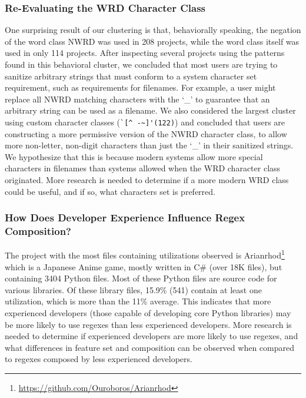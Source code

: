 \subsubsection{Re-Evaluating the WRD Character Class}
One surprising result of our clustering is that, behaviorally speaking, the negation of the word class NWRD was used in 208 projects, while the word class itself was used in only 114 projects. After inspecting several projects using the patterns found in this behavioral cluster, we concluded that most users are trying to sanitize arbitrary strings that must conform to a system character set requirement, such as requirements for filenames.  For example, a user might replace all NWRD matching characters with the `\_' to guarantee that an arbitrary string can be used as a filename.  We also considered the largest cluster using custom character classes (\verb?`[^ -~]'(122)?) and concluded that users are constructing a more permissive version of the NWRD character class, to allow more non-letter, non-digit characters than just the `\_' in their sanitized strings.  We hypothesize that this is because modern systems allow more special characters in filenames than systems allowed when the WRD character class originated.  More research is needed to determine if a more modern WRD class could be useful, and if so, what characters set is preferred.
\leavevmode\color{black}
\subsubsection{How Does Developer Experience Influence Regex Composition?}
The project with the most files containing utilizations observed is Arianrhod\footnote{\url{https://github.com/Ouroboros/Arianrhod}} which is a Japanese Anime game, mostly written in C\# (over 18K files), but containing 3404 Python files.  Most of these Python files are source code for various libraries.  Of these library files, 15.9\% (541) contain at least one utilization, which is more than the 11\% average.  This indicates that more experienced developers (those capable of developing core Python libraries) may be more likely to use regexes than less experienced developers.  More research is needed to determine if experienced developers are more likely to use regexes, and what differences in feature set and composition can be observed when compared to regexes composed by less experienced developers.
\leavevmode\color{gray}
